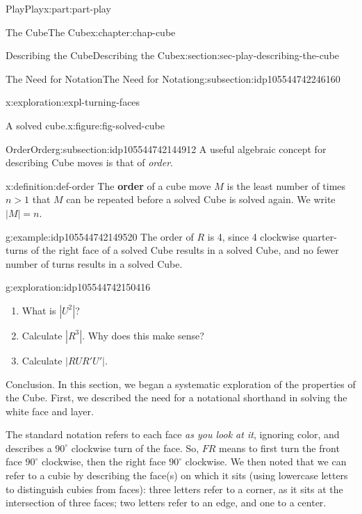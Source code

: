 \documentclass[oneside,10pt,]{book}
\newcommand{\terminology}[1]{\textbf{#1}}
\numberwithin{equation}{section}
\newcommand{\gt}{>}
\begin{document}
\begin{partptx}{Play}{}{Play}{}{}{x:part:part-play}
\begin{chapterptx}{The Cube}{}{The Cube}{}{}{x:chapter:chap-cube}
\begin{sectionptx}{Describing the Cube}{}{Describing the Cube}{}{}{x:section:sec-play-describing-the-cube}
\begin{subsectionptx}{The Need for Notation}{}{The Need for Notation}{}{}{g:subsection:idp105544742246160}
\begin{exploration}{}{x:exploration:expl-turning-faces}
\begin{figureptx}{A solved cube.}{x:figure:fig-solved-cube}{}
\tcblower
\end{figureptx}%
\end{exploration}%
\end{subsectionptx}
%
%
\typeout{************************************************}
\typeout{************************************************}
%
\begin{subsectionptx}{Order}{}{Order}{}{}{g:subsection:idp105544742144912}
A useful algebraic concept for describing Cube moves is that of \emph{order}.%
\begin{definition}{}{x:definition:def-order}%
%
The \terminology{order} of a cube move \(M\) is the least number of times \(n \gt 1\) that \(M\) can be repeated before a solved Cube is solved again. We write \(|M| = n\).%
\end{definition}
\begin{example}{}{g:example:idp105544742149520}%
The order of \(R\) is 4, since 4 clockwise quarter-turns of the right face of a solved Cube results in a solved Cube, and no fewer number of turns results in a solved Cube.%
\end{example}
\begin{exploration}{}{g:exploration:idp105544742150416}%
%
\begin{enumerate}
\item{}What is \(|U^2|\)?%
\item{}Calculate \(|R^3|\). Why does this make sense?%
\item{}Calculate \(|RUR' U '|\).%
\end{enumerate}
\end{exploration}%
\end{subsectionptx}
\begin{conclusion}{Conclusion.}%
In this section, we began a systematic exploration of the properties of the Cube. First, we described the need for a notational shorthand in solving the white face and layer.%
\par
The standard notation refers to each face \emph{as you look at it}, ignoring color, and describes a \(90^\circ\) clockwise turn of the face. So, \(FR\) means to first turn the front face \(90^\circ\) clockwise, then the right face \(90^\circ\) clockwise. We then noted that we can refer to a cubie by describing the face(s) on which it sits (using lowercase letters to distinguish cubies from faces): three letters refer to a corner, as it sits at the intersection of three faces; two letters refer to an edge, and one to a center.%
\par

\end{conclusion}
\end{sectionptx}
\end{chapterptx}
\end{partptx}
\end{document}
